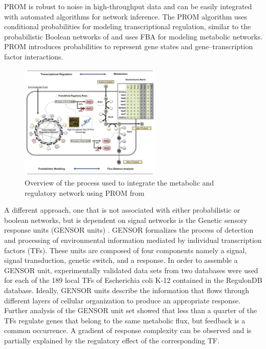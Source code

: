 \documentclass[12pt,chapterheads]{ucsd}
\begin{document}
PROM is robust to noise in high-throughput data and can be easily integrated with automated algorithms for network inference. The PROM algorithm uses conditional probabilities for modeling transcriptional regulation, similar to the probabilistic Boolean networks of \cite{pmid11847074} and uses FBA \cite{pmid14580578} for modeling metabolic networks. PROM introduces probabilities to represent gene states and gene–transcription factor interactions. 

\begin{figure}[h] 
\centering
\includegraphics[width=0.6\textwidth]{Prom_appr}
\caption[Overview of the process used to integrate the metabolic and regulatory network using PROM]
{Overview of the process used to integrate the metabolic and regulatory network using PROM from \cite{Chandrasekaran17845}}
\label{fig:prom_attr}
\end{figure}

A different approach, one that is not associated with either probabilistic or boolean networks, but is dependent on signal networks is the Genetic sensory response units (GENSOR units) \cite{10.3389/fmicb.2017.01466}. GENSOR formalizes the process of detection and processing of environmental information mediated by individual transcription factors (TFs). These units are composed of four components namely a signal, signal transduction, genetic switch, and a response. In order to assemble a GENSOR unit,  experimentally validated data sets from two databases were used for each of the 189 local TFs of Escherichia coli K-12 contained in the RegulonDB database. Ideally, GENSOR units describe the information that flows through different layers of cellular organization to produce an appropriate response. Further analysis of the GENSOR unit set showed that less than a quarter of the TFs regulate genes that belong to the same metabolic flux, but feedback is a common occurrence. A gradient of response complexity can be observed and is partially explained by the regulatory effect of the corresponding TF. 
\end{document}
